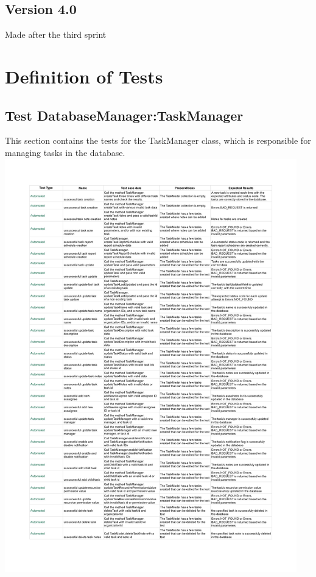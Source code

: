 \documentclass{article}
\begin{document}
\begin{center}
\vspace*{3in}
\subsection{Version 4.0}
Made after the third sprint
\end{center}

\begin{minipage}{\textwidth}
  \section{Definition of Tests}
  \subsection*{Test DatabaseManager:TaskManager}
  This section contains the tests for the TaskManager class, which is responsible for managing tasks in the database.
  \newline
  \includegraphics[width=0.95\textwidth]{images/Test_DatabaseManagerTaskManager-immagini-0.jpg}
\end{minipage}
\end{document}
